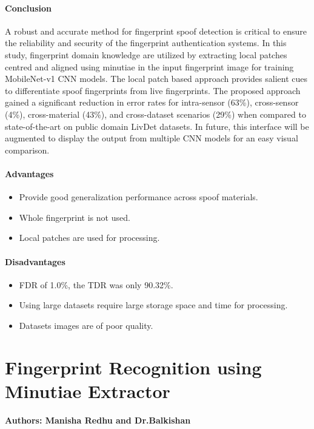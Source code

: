 \paragraph{\textbf{Conclusion}}
A robust and accurate method for fingerprint spoof detection is critical to ensure the reliability and security of the fingerprint authentication systems. In this study, fingerprint domain knowledge are utilized by extracting local patches centred and aligned using minutiae in the input fingerprint image for training MobileNet-v1 CNN models. The local patch based approach provides salient cues to differentiate spoof fingerprints from live fingerprints. The proposed approach gained a significant reduction in error rates for intra-sensor (63\%), cross-sensor (4\%), cross-material (43\%),
and cross-dataset scenarios (29\%) when compared to state-of-the-art on public domain LivDet datasets.
In future, this interface will be augmented to display the output from multiple CNN models for an easy visual comparison.

\paragraph{Advantages}
\begin{itemize}
\item Provide good generalization performance across spoof materials.
\item Whole fingerprint is not used.
\item Local patches are used for processing.
\end{itemize}
\paragraph{Disadvantages}
\begin{itemize}
\item FDR of 1.0\%, the TDR was only 90.32\%. 
\item Using large datasets require large storage space and time for processing.
\item Datasets images are of poor quality.
\end{itemize}

\section{Fingerprint Recognition using Minutiae Extractor}
\textbf{Authors: Manisha Redhu and Dr.Balkishan}
